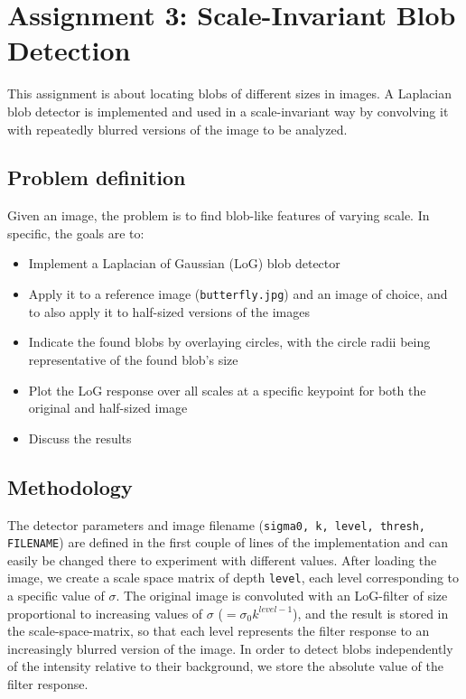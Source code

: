 \section{Assignment 3: Scale-Invariant Blob Detection}
\label{sec:assignment3}

This assignment is about locating blobs of different sizes in images. A Laplacian blob detector is implemented and used in a scale-invariant way by convolving it with repeatedly blurred versions of the image to be analyzed.

\subsection{Problem definition}

Given an image, the problem is to find blob-like features of varying scale. In specific, the goals are to:
\begin{itemize}[noitemsep]
\item Implement a Laplacian of Gaussian (LoG) blob detector
\item Apply it to a reference image (\texttt{butterfly.jpg}) and an image of choice, and to also apply it to half-sized versions of the images
\item Indicate the found blobs by overlaying circles, with the circle radii being representative of the found blob's size
\item Plot the LoG response over all scales at a specific keypoint for both the original and half-sized image
\item Discuss the results
\end{itemize}

\subsection{Methodology}

The detector parameters and image filename (\texttt{sigma0, k, level, thresh, FILENAME}) are defined in the first couple of lines of the implementation and can easily be changed there to experiment with different values.
After loading the image, we create a scale space matrix of depth \texttt{level}, each level corresponding to a specific value of $\sigma$.
The original image is convoluted with an LoG-filter of size proportional to increasing values of $\sigma$ ($= \sigma_0 k^{level-1}$), and the result is stored in the scale-space-matrix, so that each level represents the filter response to an increasingly blurred version of the image.
In order to detect blobs independently of the intensity relative to their background, we store the absolute value of the filter response.

